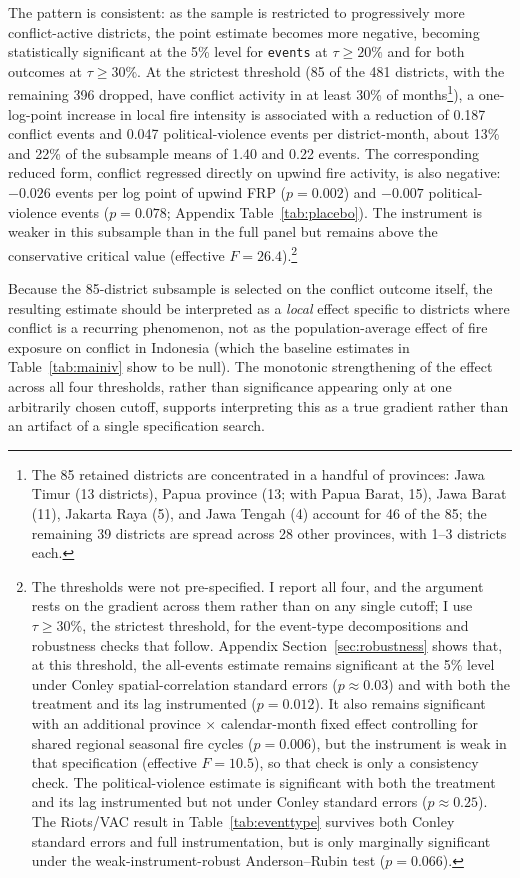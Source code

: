 \documentclass[12pt]{article}
\begin{document}
The pattern is consistent: as the sample is restricted to progressively more conflict-active districts, the point estimate becomes more negative, becoming statistically significant at the 5\% level for \texttt{events} at $\tau \geq 20\%$ and for both outcomes at $\tau \geq 30\%$. At the strictest threshold (85 of the 481 districts, with the remaining 396 dropped, have conflict activity in at least 30\% of months\footnote{The 85 retained districts are concentrated in a handful of provinces: Jawa Timur (13 districts), Papua province (13; with Papua Barat, 15), Jawa Barat (11), Jakarta Raya (5), and Jawa Tengah (4) account for 46 of the 85; the remaining 39 districts are spread across 28 other provinces, with 1--3 districts each.}), a one-log-point increase in local fire intensity is associated with a reduction of 0.187 conflict events and 0.047 political-violence events per district-month, about 13\% and 22\% of the subsample means of 1.40 and 0.22 events. The corresponding reduced form, conflict regressed directly on upwind fire activity, is also negative: $-0.026$ events per log point of upwind FRP ($p=0.002$) and $-0.007$ political-violence events ($p=0.078$; Appendix Table~\ref{tab:placebo}). The instrument is weaker in this subsample than in the full panel but remains above the conservative critical value (effective $F = 26.4$).\footnote{The thresholds were not pre-specified. I report all four, and the argument rests on the gradient across them rather than on any single cutoff; I use $\tau \geq 30\%$, the strictest threshold, for the event-type decompositions and robustness checks that follow. Appendix Section~\ref{sec:robustness} shows that, at this threshold, the all-events estimate remains significant at the 5\% level under Conley spatial-correlation standard errors ($p \approx 0.03$) and with both the treatment and its lag instrumented ($p=0.012$). It also remains significant with an additional province $\times$ calendar-month fixed effect controlling for shared regional seasonal fire cycles ($p=0.006$), but the instrument is weak in that specification (effective $F = 10.5$), so that check is only a consistency check. The political-violence estimate is significant with both the treatment and its lag instrumented but not under Conley standard errors ($p \approx 0.25$). The Riots/VAC result in Table~\ref{tab:eventtype} survives both Conley standard errors and full instrumentation, but is only marginally significant under the weak-instrument-robust Anderson--Rubin test ($p=0.066$).}

Because the 85-district subsample is selected on the conflict outcome itself, the resulting estimate should be interpreted as a \emph{local} effect specific to districts where conflict is a recurring phenomenon, not as the population-average effect of fire exposure on conflict in Indonesia (which the baseline estimates in Table~\ref{tab:mainiv} show to be null). The monotonic strengthening of the effect across all four thresholds, rather than significance appearing only at one arbitrarily chosen cutoff, supports interpreting this as a true gradient rather than an artifact of a single specification search.
\end{document}
